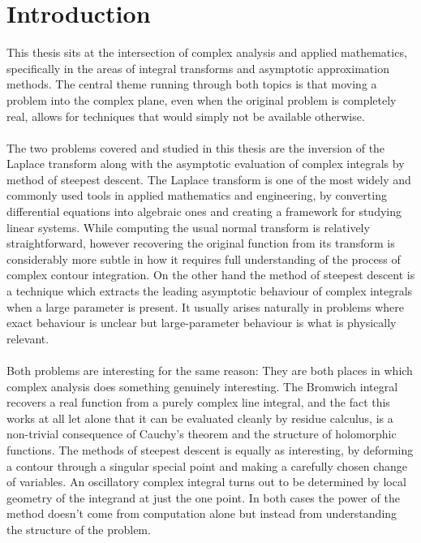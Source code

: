 \chapter{Introduction}


This thesis sits at the intersection of complex analysis and applied mathematics, specifically in the areas of integral transforms and asymptotic approximation methods. The central theme running through both topics is that moving a problem into the complex plane, even when the original problem is completely real, allows for techniques that would simply not be available otherwise.
\\
\\
The two problems covered and studied in this thesis are the inversion of the Laplace transform along with the asymptotic evaluation of complex integrals by method of steepest descent. The Laplace transform is one of the most widely and commonly used tools in applied mathematics and engineering, by converting differential equations into algebraic ones and creating a framework for studying linear systems. While computing the usual normal transform is relatively straightforward, however recovering the original function from its transform is considerably more subtle in how it requires full understanding of the process of complex contour integration. On the other hand the method of steepest descent is a technique which extracts the leading asymptotic behaviour of complex integrals when a large parameter is present. It usually arises naturally in problems where exact behaviour is unclear but large-parameter behaviour is what is physically relevant.
\\
\\
Both problems are interesting for the same reason: They are both places in which complex analysis does something genuinely interesting. The Bromwich integral recovers a real function from a purely complex line integral, and the fact this works at all let alone that it can be evaluated cleanly by residue calculus, is a non-trivial consequence of Cauchy's theorem and the structure of holomorphic functions. The methods of steepest descent is equally as interesting, by deforming a contour through a singular special point and making a carefully chosen change of variables. An oscillatory complex integral turns out to be determined by local geometry of the integrand at just the one point. In both cases the power of the method doesn't come from computation alone but instead from understanding the structure of the problem. 

